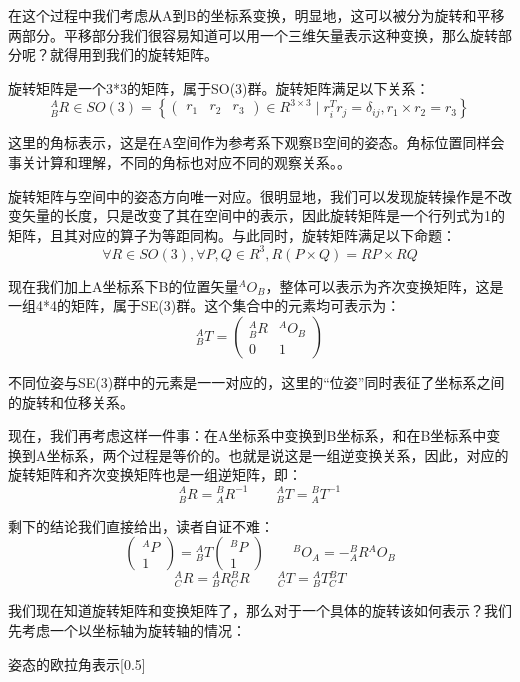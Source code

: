 在这个过程中我们考虑从A到B的坐标系变换，明显地，这可以被分为旋转和平移两部分。平移部分我们很容易知道可以用一个三维矢量表示这种变换，那么旋转部分呢？就得用到我们的旋转矩阵。

旋转矩阵是一个3*3的矩阵，属于SO(3)群。旋转矩阵满足以下关系：
\[^A_B R \in SO(3) = 
\left\{
\begin{pmatrix}
    r_1 & r_2 & r_3
\end{pmatrix}
\in {R}^{3\times3} \mid r_i^T r_j = \delta_{ij},r_1\times r_2 = r_3
\right\}
\]

这里的角标表示，这是在A空间作为参考系下观察B空间的姿态。角标位置同样会事关计算和理解，不同的角标也对应不同的观察关系。。

旋转矩阵与空间中的姿态方向唯一对应。很明显地，我们可以发现旋转操作是不改变矢量的长度，只是改变了其在空间中的表示，因此旋转矩阵是一个行列式为1的矩阵，且其对应的算子为等距同构。与此同时，旋转矩阵满足以下命题：
\[\forall R\in SO(3),\forall P,Q\in R^3,R(P\times Q) = RP\times RQ\]

现在我们加上A坐标系下B的位置矢量$^A O_B$，整体可以表示为齐次变换矩阵，这是一组4*4的矩阵，属于SE(3)群。这个集合中的元素均可表示为：
\[^A_B T = 
\begin{pmatrix}
    ^A_B R & ^A O_B \\
    0 & 1
\end{pmatrix}
\]

不同位姿与SE(3)群中的元素是一一对应的，这里的“位姿”同时表征了坐标系之间的旋转和位移关系。

现在，我们再考虑这样一件事：在A坐标系中变换到B坐标系，和在B坐标系中变换到A坐标系，两个过程是等价的。也就是说这是一组逆变换关系，因此，对应的旋转矩阵和齐次变换矩阵也是一组逆矩阵，即：
\[^A_B R = {}^B_A R^{-1}\qquad ^A_B T = {}^B_A T^{-1}\]

剩下的结论我们直接给出，读者自证不难：
\[\begin{pmatrix}
    ^A P\\
    1
\end{pmatrix} = {}^A_B T \begin{pmatrix}
    ^B P\\
    1
\end{pmatrix}\qquad ^B O_A = -{}^B_A R {}^A O_B
\]
\[^A_C R = {}^A_B R {}^B_C R\qquad ^A_C T = {}^A_B T {}^B_C T\]

我们现在知道旋转矩阵和变换矩阵了，那么对于一个具体的旋转该如何表示？我们先考虑一个以坐标轴为旋转轴的情况：
\begin{singlefigure}[姿态的表示]{姿态的欧拉角表示}[0.5]
\end{singlefigure}

